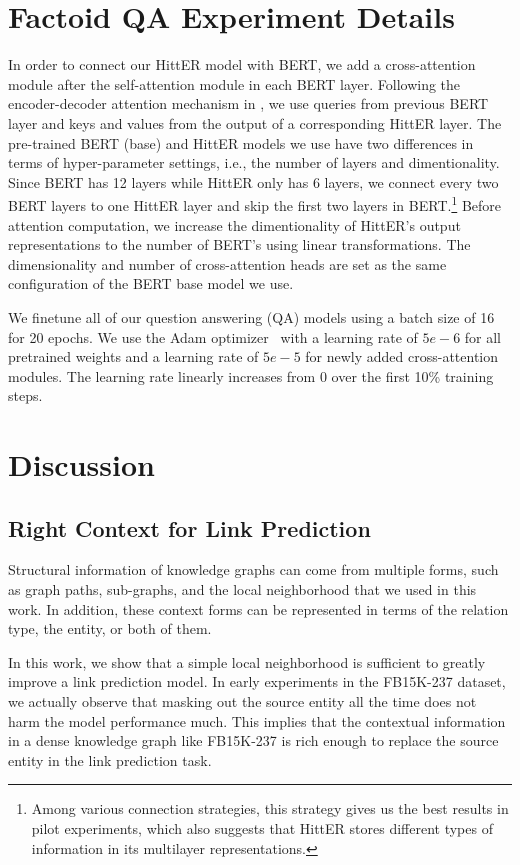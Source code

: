 \documentclass[11pt]{article}
\begin{document}
\section{Factoid QA Experiment Details}
In order to connect our HittER model with BERT, we add a cross-attention module after the self-attention module in each BERT layer.
Following the encoder-decoder attention mechanism in \citet{vaswani2017attention}, we use queries from previous BERT layer and keys and values from the output of a corresponding HittER layer.
The pre-trained BERT (base) and HittER models we use have two differences in terms of hyper-parameter settings, i.e., the number of layers and dimentionality.
Since BERT has 12 layers while HittER only has 6 layers, we connect every two BERT layers to one HittER layer and skip the first two layers in BERT.\footnote{
Among various connection strategies, this strategy gives us the best results in pilot experiments, which also suggests that HittER stores different types of information in its multilayer representations.}
Before attention computation, we increase the dimentionality of HittER's output representations to the number of BERT's using linear transformations.
The dimensionality and number of cross-attention heads are set as the same configuration of the BERT base model we use. 

We finetune all of our question answering (QA) models using a batch size of 16 for 20 epochs.
We use the Adam optimizer~\cite{kingma2014adam} with a learning rate of $5e-6$ for all pretrained weights and a learning rate of $5e-5$ for newly added cross-attention modules.
The learning rate linearly increases from 0 over the first 10\% training steps.

\section{Discussion}
\label{sec:discussion}

\subsection{Right Context for Link Prediction}

Structural information of knowledge graphs can come from multiple forms, such as graph paths, sub-graphs, and the local neighborhood that we used in this work. In addition, these context forms can be represented in terms of the relation type, the entity, or both of them. 

In this work, we show that a simple local neighborhood is sufficient to greatly improve a link prediction model.
In early experiments in the FB15K-237 dataset, we actually observe that masking out the source entity all the time does not harm the model performance much.
This implies that the contextual information in a dense knowledge graph like FB15K-237 is rich enough to replace the source entity in the link prediction task.
\end{document}
